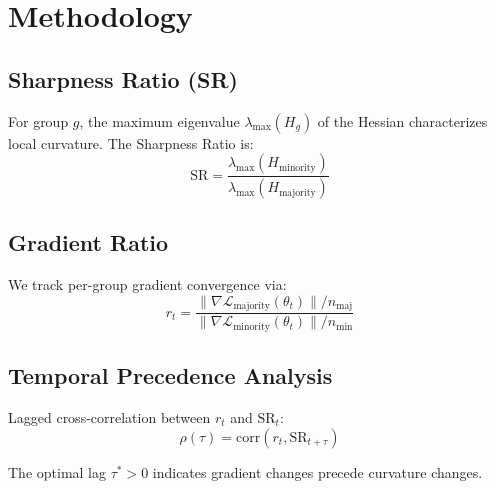 \section{Methodology}

\subsection{Sharpness Ratio (SR)}

For group $g$, the maximum eigenvalue $\lambda_{\max}(H_g)$ of the Hessian characterizes local curvature. The Sharpness Ratio is:
\begin{equation}
\text{SR} = \frac{\lambda_{\max}(H_{\text{minority}})}{\lambda_{\max}(H_{\text{majority}})}
\end{equation}

\subsection{Gradient Ratio}

We track per-group gradient convergence via:
\begin{equation}
r_t = \frac{\|\nabla \mathcal{L}_{\text{majority}}(\theta_t)\| / n_{\text{maj}}}{\|\nabla \mathcal{L}_{\text{minority}}(\theta_t)\| / n_{\text{min}}}
\end{equation}

\subsection{Temporal Precedence Analysis}

Lagged cross-correlation between $r_t$ and $\text{SR}_t$:
\begin{equation}
\rho(\tau) = \text{corr}(r_{t}, \text{SR}_{t+\tau})
\end{equation}

The optimal lag $\tau^* > 0$ indicates gradient changes precede curvature changes.
